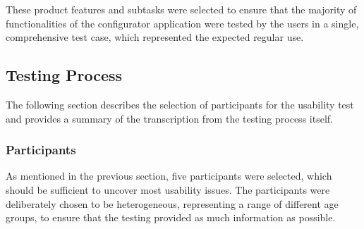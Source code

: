 These product features and subtasks were selected to ensure that the majority of functionalities of the configurator application were tested by the users in a single, comprehensive test case, which represented the expected regular use. 

\subsection{Testing Process}

The following section describes the selection of participants for the usability test and provides a summary of the transcription from the testing process itself. 

\subsubsection{Participants}

As mentioned in the previous section, five participants were selected, which should be sufficient to uncover most usability issues. The participants were deliberately chosen to be heterogeneous, representing a range of different age groups, to ensure that the testing provided as much information as possible.

